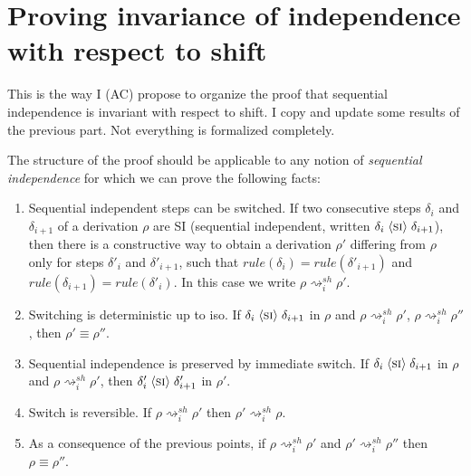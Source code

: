 \documentclass{llncs}
\newcommand{\shiftdir}[1][]{\ensuremath{\mathrel{{\rightsquigarrow}^{\mathit{sh}}_{#1}}}}
\begin{document}
\section{Proving invariance of independence with respect to shift}
\newcommand{\si}{\ensuremath{\mathrel{\langle \mbox{\textsc{si}}\rangle}}}

This is the way I (AC) propose to organize the proof that sequential independence is invariant with respect to shift. I copy and update some results of the previous part. Not everything is formalized completely. 

The structure of the proof should be applicable to any notion of \emph{sequential independence} for which we can prove the following facts:

\begin{definition}
\label{def:si-conditions}
\begin{enumerate}
\item \label{cond:CR} Sequential independent steps can be switched. If two consecutive steps $\delta_i$ and $\delta_{i+1}$ of a derivation $\rho$ are SI (sequential independent, written $\delta_i \si \delta_{i+1}$), then there is a constructive way to obtain a derivation $\rho'$ differing from $\rho$ only for steps $\delta'_i$ and $\delta'_{i+1}$, such that $rule(\delta_i) = rule(\delta'_{i+1})$ and $rule(\delta_{i+1}) = rule(\delta'_{i})$. In this case we write $\rho \shiftdir[i] \rho'$.

\item  \label{cond:CRdet} Switching is deterministic up to iso. If $\delta_i \si \delta_{i+1}$ in $\rho$ and $\rho \shiftdir[i] \rho'$, $\rho \shiftdir[i] \rho''$, then $\rho' \equiv \rho''$.

\item \label{cond:si-symm} Sequential independence is preserved by immediate switch. If $\delta_i \si \delta_{i+1}$ in $\rho$ and $\rho \shiftdir[i] \rho'$, then $\delta'_i \si \delta'_{i+1}$ in $\rho'$.

\item  \label{cond:si-si-iso} Switch is reversible. If $\rho \shiftdir[i] \rho'$ then $\rho' \shiftdir[i] \rho$.

\item As a consequence of the previous points, if $\rho \shiftdir[i] \rho'$ and $\rho' \shiftdir[i] \rho''$ then $\rho \equiv \rho''$.

\end{enumerate}
\end{definition}
\end{document}
